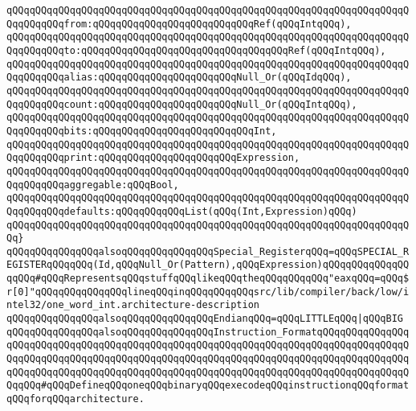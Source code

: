 \verb|qQQqqQQqqQQqqQQqqQQqqQQqqQQqqQQqqQQqqQQqqQQqqQQqqQQqqQQqqQQqqQQqqQQqqQQqqQQqqQQqfrom:qQQqqQQqqQQqqQQqqQQqqQQqqQQqRef(qQQqIntqQQq),|\newline
\verb|qQQqqQQqqQQqqQQqqQQqqQQqqQQqqQQqqQQqqQQqqQQqqQQqqQQqqQQqqQQqqQQqqQQqqQQqqQQqqQQqto:qQQqqQQqqQQqqQQqqQQqqQQqqQQqqQQqqQQqRef(qQQqIntqQQq),|\newline
\verb|qQQqqQQqqQQqqQQqqQQqqQQqqQQqqQQqqQQqqQQqqQQqqQQqqQQqqQQqqQQqqQQqqQQqqQQqqQQqqQQqalias:qQQqqQQqqQQqqQQqqQQqqQQqNull_Or(qQQqIdqQQq),|\newline
\verb|qQQqqQQqqQQqqQQqqQQqqQQqqQQqqQQqqQQqqQQqqQQqqQQqqQQqqQQqqQQqqQQqqQQqqQQqqQQqqQQqcount:qQQqqQQqqQQqqQQqqQQqqQQqNull_Or(qQQqIntqQQq),|\newline
\verb|qQQqqQQqqQQqqQQqqQQqqQQqqQQqqQQqqQQqqQQqqQQqqQQqqQQqqQQqqQQqqQQqqQQqqQQqqQQqqQQqbits:qQQqqQQqqQQqqQQqqQQqqQQqqQQqInt,|\newline
\verb|qQQqqQQqqQQqqQQqqQQqqQQqqQQqqQQqqQQqqQQqqQQqqQQqqQQqqQQqqQQqqQQqqQQqqQQqqQQqqQQqprint:qQQqqQQqqQQqqQQqqQQqqQQqExpression,|\newline
\verb|qQQqqQQqqQQqqQQqqQQqqQQqqQQqqQQqqQQqqQQqqQQqqQQqqQQqqQQqqQQqqQQqqQQqqQQqqQQqqQQqaggregable:qQQqBool,|\newline
\verb|qQQqqQQqqQQqqQQqqQQqqQQqqQQqqQQqqQQqqQQqqQQqqQQqqQQqqQQqqQQqqQQqqQQqqQQqqQQqqQQqdefaults:qQQqqQQqqQQqList(qQQq(Int,Expression)qQQq)|\newline
\verb|qQQqqQQqqQQqqQQqqQQqqQQqqQQqqQQqqQQqqQQqqQQqqQQqqQQqqQQqqQQqqQQqqQQqqQQq}|\newline
\newline
\verb|qQQqqQQqqQQqqQQqalsoqQQqqQQqqQQqqQQqSpecial_RegisterqQQq=qQQqSPECIAL_REGISTERqQQqqQQq(Id,qQQqNull_Or(Pattern),qQQqExpression)qQQqqQQqqQQqqQQqqQQq#qQQqRepresentsqQQqstuffqQQqlikeqQQqtheqQQqqQQqqQQq"eaxqQQq=qQQq$r[0]"qQQqqQQqqQQqqQQqlineqQQqinqQQqqQQqqQQqsrc/lib/compiler/back/low/intel32/one_word_int.architecture-description|\newline
\newline
\verb|qQQqqQQqqQQqqQQqalsoqQQqqQQqqQQqqQQqEndianqQQq=qQQqLITTLEqQQq|\verb#|qQQqBIG#\newline
\newline
\verb|qQQqqQQqqQQqqQQqalsoqQQqqQQqqQQqqQQqInstruction_FormatqQQqqQQqqQQqqQQqqQQqqQQqqQQqqQQqqQQqqQQqqQQqqQQqqQQqqQQqqQQqqQQqqQQqqQQqqQQqqQQqqQQqqQQqqQQqqQQqqQQqqQQqqQQqqQQqqQQqqQQqqQQqqQQqqQQqqQQqqQQqqQQqqQQqqQQqqQQqqQQqqQQqqQQqqQQqqQQqqQQqqQQqqQQqqQQqqQQqqQQqqQQqqQQqqQQqqQQqqQQqqQQqqQQqqQQq#qQQqDefineqQQqoneqQQqbinaryqQQqexecodeqQQqinstructionqQQqformatqQQqforqQQqarchitecture.|\newline
